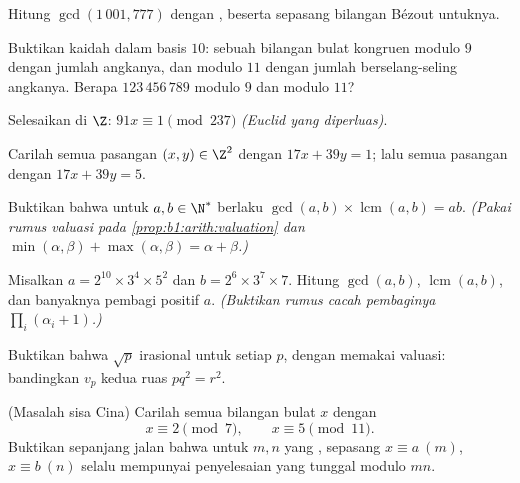 \begin{exercise}[$\star$]\label{exo:b1:arith:1}
Hitung $\gcd(1\,001, 777)$ dengan , beserta sepasang bilangan
Bézout untuknya.
\end{exercise}

\begin{exercise}[$\star$]\label{exo:b1:arith:2}
Buktikan kaidah  dalam basis $10$: sebuah bilangan bulat kongruen modulo
$9$ dengan jumlah angkanya, dan modulo $11$ dengan jumlah berselang-seling
angkanya. Berapa $123\,456\,789$ modulo $9$ dan modulo $11$?
\end{exercise}

\begin{exercise}[$\star$]\label{exo:b1:arith:3}
Selesaikan di $\Z$: $91x \equiv 1 \pmod{237}$ \emph{(Euclid yang diperluas)}.
\end{exercise}

\begin{exercise}[$\star$]\label{exo:b1:arith:4}
Carilah semua pasangan $(x, y) \in \Z^2$ dengan $17x + 39y = 1$; lalu semua pasangan
dengan $17 x + 39 y = 5$.
\end{exercise}

\begin{exercise}[$\star\star$]\label{exo:b1:arith:5}
Buktikan bahwa untuk $a, b \in \N^*$ berlaku $\gcd(a,b) \times
\operatorname{lcm}(a,b) = ab$. \emph{(Pakai rumus valuasi pada
\cref{prop:b1:arith:valuation} dan $\min(\alpha,\beta) +
\max(\alpha,\beta) = \alpha + \beta$.)}
\end{exercise}

\begin{exercise}[$\star\star$]\label{exo:b1:arith:6}
Misalkan $a = 2^{10} \times 3^4 \times 5^2$ dan $b = 2^6 \times 3^7 \times
7$. Hitung $\gcd(a, b)$, $\operatorname{lcm}(a,b)$, dan banyaknya
pembagi positif $a$. \emph{(Buktikan rumus cacah pembaginya
$\prod_i (\alpha_i + 1)$.)}
\end{exercise}

\begin{exercise}[$\star\star$]\label{exo:b1:arith:7}
Buktikan bahwa $\sqrt p$ irasional untuk setiap  $p$, dengan memakai
valuasi: bandingkan $v_p$ kedua ruas $p q^2 = r^2$.
\end{exercise}

\begin{exercise}[$\star\star$]\label{exo:b1:arith:8}
(Masalah sisa Cina) Carilah semua bilangan bulat $x$ dengan
\[
x \equiv 2 \pmod 7, \qquad x \equiv 5 \pmod{11}.
\]
Buktikan sepanjang jalan bahwa untuk $m, n$ yang , sepasang 
$x \equiv a \ (m)$, $x \equiv b\ (n)$ selalu mempunyai penyelesaian yang tunggal
modulo $mn$.
\end{exercise}

